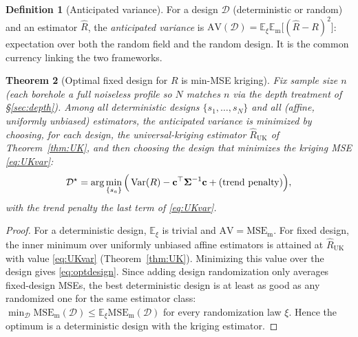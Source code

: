 \documentclass{amsart}
\newtheorem{theorem}{Theorem}
\theoremstyle{definition}
\newtheorem{definition}[theorem]{Definition}
\newcommand{\E}{\mathbb{E}}
\newcommand{\Var}{\operatorname{Var}}
\newcommand{\Rhat}{\widehat R}
\begin{document}
\begin{definition}[Anticipated variance]\label{def:av}
For a design $\mathcal D$ (deterministic or random) and an estimator
$\Rhat$, the \emph{anticipated variance} is
$\mathrm{AV}(\mathcal D)=\E_\xi\E_{\mathrm m}\big[(\Rhat-R)^2\big]$:
expectation over both the random field and the random design. It is the
common currency linking the two frameworks.
\end{definition}

\begin{theorem}[Optimal fixed design for $R$ is min-MSE
kriging]\label{thm:anticipated}
Fix sample size $n$ (each borehole a full noiseless profile so $N$ matches
$n$ via the depth treatment of \S\ref{sec:depth}). Among all
\emph{deterministic} designs $\{s_1,\dots,s_N\}$ and all (affine, uniformly
unbiased) estimators, the anticipated variance is minimized by choosing,
\emph{for each design}, the universal-kriging estimator
$\Rhat_{\mathrm{UK}}$ of Theorem~\ref{thm:UK}, and then choosing the
design that minimizes the kriging MSE \eqref{eq:UKvar}:
\begin{equation}\label{eq:optdesign}
\mathcal D^\star
=\arg\min_{\{s_a\}}
\Big(\Var(R)-\mathbf c^\top\boldsymbol\Sigma^{-1}\mathbf c
+\text{\rm(trend penalty)}\Big),
\end{equation}
with the trend penalty the last term of \eqref{eq:UKvar}.
\end{theorem}
\begin{proof}
For a deterministic design, $\E_\xi$ is trivial and
$\mathrm{AV}=\mathrm{MSE}_{\mathrm m}$. For fixed design, the inner minimum
over uniformly unbiased affine estimators is attained at
$\Rhat_{\mathrm{UK}}$ with value \eqref{eq:UKvar}
(Theorem~\ref{thm:UK}). Minimizing this value over the design gives
\eqref{eq:optdesign}. Since adding design randomization only averages
fixed-design MSEs, the best deterministic design is at least as good as any
randomized one for the same estimator class:
$\min_{\mathcal D}\mathrm{MSE}_{\mathrm m}(\mathcal D)
\le \E_\xi \mathrm{MSE}_{\mathrm m}(\mathcal D)$ for every randomization
law $\xi$. Hence the optimum is a deterministic design with the kriging
estimator.
\end{proof}
\end{document}
